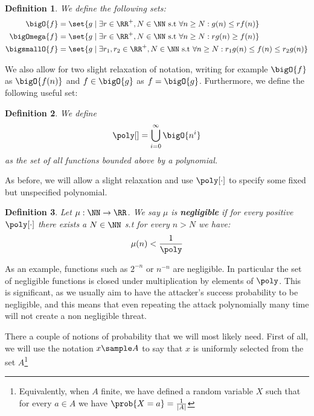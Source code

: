 \documentclass{article}
\newtheorem{definition}{Definition}
\begin{document}
\begin{definition} We define the following sets:
    \begin{align*}
        \bigO{f}      & = \set{ g \mid \exists r \in \RR^+, N \in \NN \text{ s.t } \forall n \geq N : g(n) \leq r f(n)  }                       \\
        \bigOmega{f}  & = \set{ g \mid \exists r \in \RR^+, N \in \NN \text{ s.t } \forall n \geq N : r g(n) \geq f(n)  }                       \\
        \bigsmallO{f} & = \set{ g \mid \exists r_1,r_2 \in \RR^+, N \in \NN \text{ s.t } \forall n \geq N : r_1 g(n) \leq f(n) \leq r_2 g(n)  }
    \end{align*}
\end{definition}
We also allow for two slight relaxation of notation, writing for example $\bigO{f}$ as $\bigO{f(n)}$ and $f \in \bigO{g}$ as $f = \bigO{g}$. Furthermore, we define the following useful set:
\begin{definition} We define
    \[\poly[] = \bigcup_{i = 0}^\infty \bigO{n^i}\]
    as the set of all functions bounded above by a polynomial.
\end{definition}
As before, we will allow a slight relaxation and use $\poly[\cdot]$ to specify some fixed but unspecified polynomial.

\begin{definition}
    Let $\mu : \NN \to \RR$. We say $\mu$ is \textbf{negligible} if for every positive $\poly[\cdot]$ there exists a $N \in \NN$ s.t for every $n > N$ we have:
    \[\mu(n) < \frac{1}{\poly}\]
\end{definition}
As an example, functions such as $2^{-n}$ or $n^{-n}$ are negligible. In particular the set of negligible functions is closed under multiplication by elements of $\poly$. This is significant, as we usually aim to have the attacker's success probability to be negligible, and this means that even repeating the attack polynomially many time will not create a non negligible threat. \par

There a couple of notions of probability that we will most likely need.
First of all, we will use the notation $x \sample A$ to say that $x$ is uniformly selected from the set $A$\footnote{Equivalently, when $A$ finite, we have defined a random variable $X$ such that for every $a \in A$ we have  $\prob{X = a} = \frac{1}{|A|} $}
\end{document}
